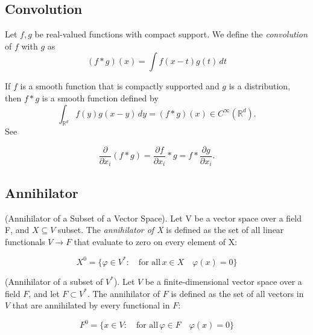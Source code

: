 \documentclass[../main.tex]{subfiles}
\begin{document}
\subsection{Convolution}
\begin{definition}
	Let $f,g$ be real-valued functions with compact support. We define the \emph{convolution} of $f$ with $g$ as $$(f\ast g)(x)=\int f(x-t)g(t) \, dt$$
\end{definition}


\begin{propo}
	If $f$ is a smooth function that is compactly supported and $g$ is a distribution, then $f\ast g$ is a smooth function defined by
	$${\displaystyle \int _{\mathbb {R} ^{d}}{f}(y)g(x-y)\,dy=(f*g)(x)\in C^{\infty }(\mathbb {R} ^{d}).} $$
	See \cite{adams2003sobolev}
	 \label{prop:29}
\end{propo}
\begin{propo} \label{prop:2}
	$${\frac {\partial }{\partial x_{i}}}(f*g)={\frac {\partial f}{\partial x_{i}}}*g=f*{\frac {\partial g}{\partial x_{i}}}.$$
\end{propo}

\subsection{Annihilator}

\begin{definition} (Annihilator of a Subset of a Vector Space). Let V be a vector space over a field F, and $X\subseteq V$ subset. The \textit{annihilator of X} is defined as the set of all linear functionals $V \rightarrow F$ that evaluate to zero on every element of X:
	
	$$ X^0 = \{ \varphi \in V^* : \quad \text{for all} \,  x \in X \quad \varphi (x) = 0 \}$$
\end{definition}


\begin{definition} (Annihilator of a subset of $V^*$). Let $V$ be a finite-dimensional vector space over a field $F$, and let $F \subset V^*$. The annihilator of $F$ is defined as the set of all vectors in $V$ that are annihilated by every functional in $F$:
	
	\[
	F^0 = \{x \in V :\quad \text{for all} \, \varphi \in F \quad\varphi(x) = 0\}
	\]
	
\end{definition}
\end{document}
